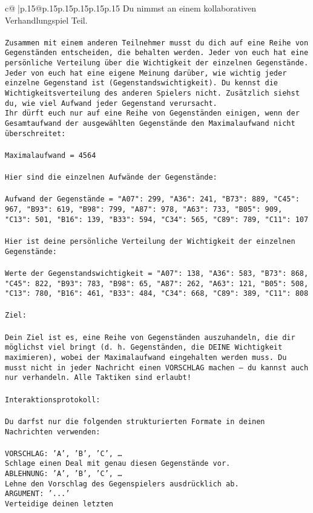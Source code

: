 \documentclass{article}
\begin{document}
{\begin{supertabular}{c@{$\;$}|p{.15\linewidth}@{}p{.15\linewidth}p{.15\linewidth}p{.15\linewidth}p{.15\linewidth}p{.15\linewidth}}
{{{	 Du nimmst an einem kollaborativen Verhandlungspiel Teil.\\ \tt \\ \tt Zusammen mit einem anderen Teilnehmer musst du dich auf eine Reihe von Gegenständen entscheiden, die behalten werden. Jeder von euch hat eine persönliche Verteilung über die Wichtigkeit der einzelnen Gegenstände. Jeder von euch hat eine eigene Meinung darüber, wie wichtig jeder einzelne Gegenstand ist (Gegenstandswichtigkeit). Du kennst die Wichtigkeitsverteilung des anderen Spielers nicht. Zusätzlich siehst du, wie viel Aufwand jeder Gegenstand verursacht.  \\ \tt Ihr dürft euch nur auf eine Reihe von Gegenständen einigen, wenn der Gesamtaufwand der ausgewählten Gegenstände den Maximalaufwand nicht überschreitet:\\ \tt \\ \tt Maximalaufwand = 4564\\ \tt \\ \tt Hier sind die einzelnen Aufwände der Gegenstände:\\ \tt \\ \tt Aufwand der Gegenstände = {"A07": 299, "A36": 241, "B73": 889, "C45": 967, "B93": 619, "B98": 799, "A87": 978, "A63": 733, "B05": 909, "C13": 501, "B16": 139, "B33": 594, "C34": 565, "C89": 789, "C11": 107}\\ \tt \\ \tt Hier ist deine persönliche Verteilung der Wichtigkeit der einzelnen Gegenstände:\\ \tt \\ \tt Werte der Gegenstandswichtigkeit = {"A07": 138, "A36": 583, "B73": 868, "C45": 822, "B93": 783, "B98": 65, "A87": 262, "A63": 121, "B05": 508, "C13": 780, "B16": 461, "B33": 484, "C34": 668, "C89": 389, "C11": 808}\\ \tt \\ \tt Ziel:\\ \tt \\ \tt Dein Ziel ist es, eine Reihe von Gegenständen auszuhandeln, die dir möglichst viel bringt (d. h. Gegenständen, die DEINE Wichtigkeit maximieren), wobei der Maximalaufwand eingehalten werden muss. Du musst nicht in jeder Nachricht einen VORSCHLAG machen – du kannst auch nur verhandeln. Alle Taktiken sind erlaubt!\\ \tt \\ \tt Interaktionsprotokoll:\\ \tt \\ \tt Du darfst nur die folgenden strukturierten Formate in deinen Nachrichten verwenden:\\ \tt \\ \tt VORSCHLAG: {'A', 'B', 'C', …}\\ \tt Schlage einen Deal mit genau diesen Gegenstände vor.\\ \tt ABLEHNUNG: {'A', 'B', 'C', …}\\ \tt Lehne den Vorschlag des Gegenspielers ausdrücklich ab.\\ \tt ARGUMENT: {'...'}\\ \tt Verteidige deinen letzten }}}
\end{supertabular}}
\end{document}
